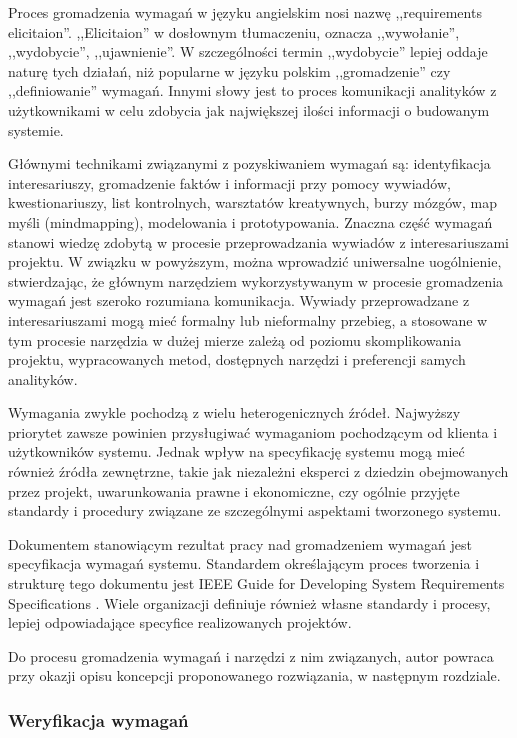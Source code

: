         Proces gromadzenia wymagań w języku angielskim nosi nazwę ,,requirements elicitaion''. ,,Elicitaion'' w dosłownym tłumaczeniu, oznacza ,,wywołanie'', ,,wydobycie'', ,,ujawnienie''. W szczególności termin ,,wydobycie'' lepiej oddaje naturę tych działań, niż popularne w języku polskim ,,gromadzenie'' czy ,,definiowanie'' wymagań. Innymi słowy jest to proces komunikacji analityków z użytkownikami w celu zdobycia jak największej ilości informacji o budowanym systemie. 

        Głównymi technikami związanymi z pozyskiwaniem wymagań są: identyfikacja interesariuszy, gromadzenie faktów i informacji przy pomocy wywiadów, kwestionariuszy, list kontrolnych, warsztatów kreatywnych, burzy mózgów, map myśli (mindmapping), modelowania i prototypowania. Znaczna część wymagań stanowi wiedzę zdobytą w procesie przeprowadzania wywiadów z interesariuszami projektu. W związku w powyższym, można wprowadzić uniwersalne uogólnienie, stwierdzając, że głównym narzędziem wykorzystywanym w procesie gromadzenia wymagań jest szeroko rozumiana komunikacja. Wywiady przeprowadzane z interesariuszami mogą mieć formalny lub nieformalny przebieg, a stosowane w tym procesie narzędzia w dużej mierze zależą od poziomu skomplikowania projektu, wypracowanych metod, dostępnych narzędzi i preferencji samych analityków. 
        
        Wymagania zwykle pochodzą z wielu heterogenicznych źródeł. Najwyższy priorytet zawsze powinien przysługiwać wymaganiom pochodzącym od klienta i użytkowników systemu. Jednak wpływ na specyfikację systemu mogą mieć również źródła zewnętrzne, takie jak niezależni eksperci z dziedzin obejmowanych przez projekt, uwarunkowania prawne i ekonomiczne, czy ogólnie przyjęte standardy i procedury związane ze szczególnymi aspektami tworzonego systemu.

        Dokumentem stanowiącym rezultat pracy nad gromadzeniem wymagań jest specyfikacja wymagań systemu. Standardem określającym proces tworzenia i strukturę tego dokumentu jest IEEE Guide for Developing System Requirements Specifications \cite{institute1984ieee}. Wiele organizacji definiuje również własne standardy i procesy, lepiej odpowiadające specyfice realizowanych projektów.

        Do procesu gromadzenia wymagań i narzędzi z nim związanych, autor powraca przy okazji opisu koncepcji proponowanego rozwiązania, w następnym rozdziale.

      \subsubsection{Weryfikacja wymagań}

